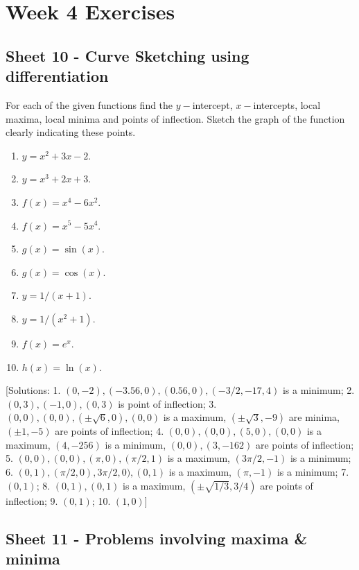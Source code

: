 \documentclass[
  11pt,
  oneside]{book}
\providecommand{\tightlist}{%
  \setlength{\itemsep}{0pt}\setlength{\parskip}{0pt}}
\newcommand{\slide}{}
\theoremstyle{definition}
\theoremstyle{definition}
\theoremstyle{definition}
\theoremstyle{definition}
\theoremstyle{remark}
\begin{document}
\chapter*{Week 4 Exercises}\label{week-4-exercises}

\section{Sheet 10 - Curve Sketching using differentiation}\label{sheet-10---curve-sketching-using-differentiation}

For each of the given functions find the \(y-\)intercept, \(x-\)intercepts, local maxima, local minima
and points of inflection. Sketch the graph of the function clearly indicating these points.

\begin{enumerate}
\def\labelenumi{\arabic{enumi}.}
\tightlist
\item
  \(y=x^2+3x-2\).
\item
  \(y=x^3+2x+3\).
\item
  \(f(x)=x^4-6x^2\).
\item
  \(f(x)=x^5-5x^4\).
\item
  \(g(x)=\sin(x)\).
\item
  \(g(x)=\cos(x)\).
\item
  \(y=1/(x+1)\).
\item
  \(y=1/(x^2+1)\).
\item
  \(f(x)=e^x\).
\item
  \(h(x)=\ln(x)\).
\end{enumerate}

{[}Solutions: 1. \((0,-2), (-3.56,0), (0.56,0), (-3/2,-17,4)\) is a minimum; 2. \((0,3), (-1,0), (0,3)\) is point of inflection; 3. \((0,0), (0,0), (\pm\sqrt{6},0), (0,0)\) is a maximum, \((\pm\sqrt{3},-9)\) are minima, \((\pm 1,-5)\) are points of inflection; 4. \((0,0), (0,0), (5,0), (0,0)\) is a maximum, \((4,-256)\) is a minimum, \((0,0), (3,-162)\) are points of inflection; 5. \((0,0), (0,0), (\pi,0), (\pi/2,1)\) is a maximum, \((3\pi/2,-1)\) is a minimum; 6. \((0,1), (\pi/2,0), 3\pi/2,0), (0,1)\) is a maximum, \((\pi,-1)\) is a minimum; 7. \((0,1)\); 8. \((0,1), (0,1)\) is a maximum, \((\pm\sqrt{1/3},3/4)\) are points of inflection; 9. \((0,1)\); 10. \((1,0)\){]}
\slide

\section{Sheet 11 - Problems involving maxima \& minima}\label{sheet-11---problems-involving-maxima-minima}
\end{document}
